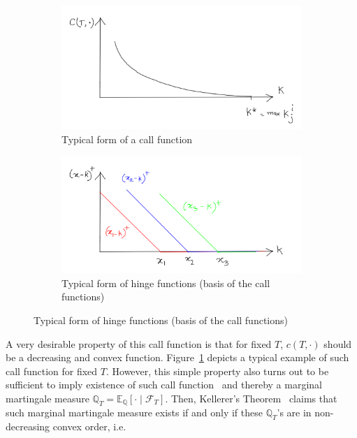 \documentclass[12pt]{article}
\newcommand{\Q}{\mathbb{Q}}
\newcommand{\E}{\mathbb{E}}
\begin{document}
\begin{figure}[ht]
    \centering
    \begin{subfigure}[b]{0.49\linewidth}
        \centering
        \includegraphics[width = \linewidth]{ctk.png}
        \caption{Typical form of a call function}
        \label{fig:call-function}
    \end{subfigure}
    \begin{subfigure}[b]{0.49\linewidth}
        \centering
        \includegraphics[width = \linewidth]{xkplus.png}
        \caption{Typical form of hinge functions (basis of the call functions)}
        \label{fig:hinge-function}
    \end{subfigure}
\end{figure}

A very desirable property of this call function is that for fixed $T$, $c(T, \cdot)$ should be a decreasing and convex function. Figure~\ref{fig:call-function} depicts a typical example of such call function for fixed $T$. However, this simple property also turns out to be sufficient to imply existence of such call function~\cite{breeden1978prices} and thereby a marginal martingale measure $\Q_T = \E_{\Q} \left[ \cdot \mid \mathcal{F}_T \right]$. Then, Kellerer's Theorem~\cite{kellerer1972markov} claims that such marginal martingale measure exists if and only if these $\Q_T$'s are in non-decreasing convex order, i.e. 
\end{document}
